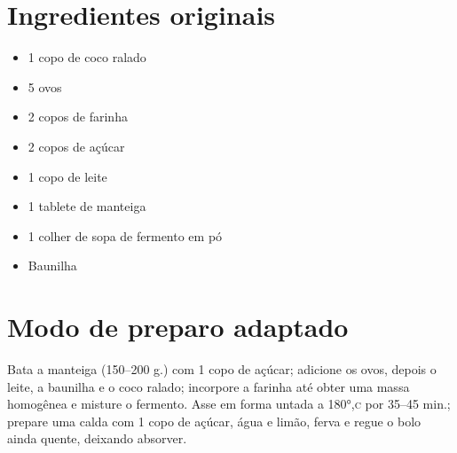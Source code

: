 \section{Ingredientes originais}

\begin{itemize}
\item 1 copo de coco ralado
\item 5 ovos
\item 2 copos de farinha
\item 2 copos de açúcar
\item 1 copo de leite
\item 1 tablete de manteiga
\item 1 colher de sopa de fermento em pó
\item Baunilha
\end{itemize}

\section{Modo de preparo adaptado}

Bata a manteiga (150--200 g.) com 1 copo de açúcar; adicione os ovos, depois o leite, a baunilha e o coco ralado; incorpore a farinha até obter uma massa homogênea e misture o fermento. Asse em forma untada a 180°,\textsc{c} por 35–45 min.; prepare uma calda com 1 copo de açúcar, água e limão, ferva e regue o bolo ainda quente, deixando absorver.